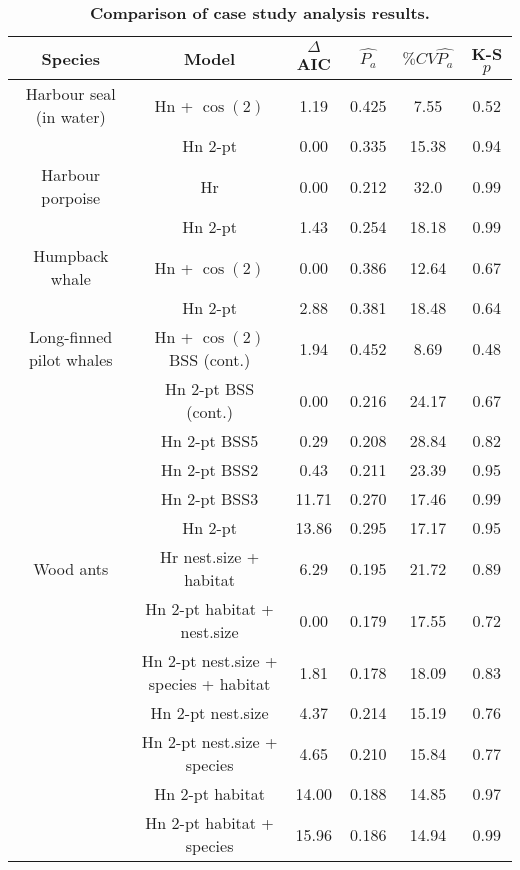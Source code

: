 \documentclass[10pt]{article}
\begin{document}
\begin{table}[!ht]
\caption{
{\bf Comparison of case study analysis results.}}
\centering
\begin{tabular}{| c | c | c | c | c | c |}
\hline
{\bf Species} & {\bf Model} & {\bf $\Delta$AIC} & $\hat{P_a}$ & {\bf $\% CV \hat{P_a}$} & {\bf K-S $p$}\\
\hline
Harbour seal (in water) & Hn + $\cos(2)$ & 1.19 & 0.425 & 7.55 & 0.52\\
\hline
 & Hn 2-pt  & 0.00 & 0.335 & 15.38 & 0.94\\
\hline
Harbour porpoise& Hr  & 0.00 & 0.212 & 32.0 & 0.99\\
\hline
 & Hn 2-pt & 1.43 & 0.254 & 18.18 & 0.99\\
\hline
Humpback whale & Hn + $\cos(2)$ & 0.00 & 0.386 & 12.64 & 0.67 \\
\hline
 & Hn 2-pt & 2.88 & 0.381 & 18.48 & 0.64 \\
\hline
Long-finned pilot whales  & Hn + $\cos(2)$ BSS (cont.) & 1.94 & 0.452 & 8.69 & 0.48\\ %
\hline
 & Hn 2-pt  BSS (cont.) & 0.00  &  0.216  &  24.17  &  0.67 \\
\hline
 & Hn 2-pt BSS5         &  0.29   &  0.208  &  28.84  &  0.82 \\
 \hline
 & Hn 2-pt  BSS2        &  0.43  &  0.211  &  23.39  &  0.95 \\
 \hline
 & Hn 2-pt  BSS3        &  11.71 &  0.270  &  17.46  &  0.99 \\
 \hline
 & Hn 2-pt          &  13.86  &  0.295  &  17.17  &  0.95 \\
 \hline
Wood ants & Hr nest.size + habitat & 6.29 & 0.195  & 21.72 & 0.89\\ %
\hline
 & Hn 2-pt habitat + nest.size                     &  0.00      &  0.179  &  17.55  &  0.72 \\
 \hline
 & Hn 2-pt nest.size + species + habitat  &  1.81   &  0.178  &  18.09  &  0.83 \\
  \hline
 & Hn 2-pt nest.size                                        &  4.37   &  0.214  &  15.19  &  0.76 \\
 \hline
 & Hn 2-pt nest.size + species                     &  4.65   &  0.210  &  15.84  &  0.77 \\
 \hline
 & Hn 2-pt habitat                                          &  14.00     &  0.188  &  14.85  &  0.97 \\
 \hline
 & Hn 2-pt habitat + species                       &  15.96  &  0.186  &  14.94  &  0.99 \\

\end{tabular}
\end{table}
\end{document}
